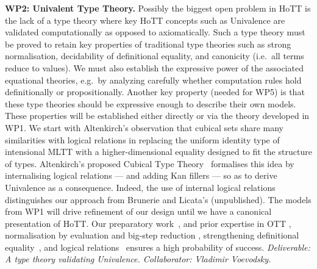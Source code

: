 \documentclass[a4paper,11pt]{article}
\begin{document}
{\bf WP2: Univalent Type Theory.}  Possibly the biggest open problem
in HoTT is the lack of a type theory where key HoTT concepts
such as Univalence are validated computationally as opposed to axiomatically. Such a type theory must be proved to retain key
properties of traditional type theories such as strong normalisation,
decidability of definitional equality, and canonicity ({i.e.}~all
terms reduce to values). We must also establish the expressive power
of the associated equational theories, {e.g.}~by analyzing carefully
whether computation rules hold definitionally or
propositionally. Another key property (needed for WP5) is that these
type theories should be expressive enough to describe their own
models. These properties will be established either directly or via the theory
developed in WP1. We start with Altenkirch's observation \cite{txa-ihp14} that cubical
sets share many similarities with logical relations in replacing the
uniform identity type of intensional MLTT with a higher-dimensional
equality designed to fit the structure of types. Altenkirch's proposed
Cubical Type Theory~\cite{alti-ctt} formalises this idea by internalising logical
relations --- and adding Kan fillers --- so as to derive Univalence as a consequence. Indeed, the use
of internal logical relations distinguishes our approach from Brunerie
and Licata's (unpublished).  The models from WP1 will drive refinement of our design
until we have a canonical presentation of HoTT. Our preparatory
work~\cite{txa-ihp14}, and prior expertise in OTT
\cite{alti:ott-conf}, normalisation by evaluation and big-step
reduction \cite{alti:lics96}, %
strengthening definitional
equality~\cite{Allais:2013:NEN:2502409.2502411}, and logical
relations~\cite{neil2014relParamDep} ensures a high probability of
success.  {\em Deliverable: A
  type theory validating Univalence.  Collaborator: Vladimir
  Voevodsky.  } 




\end{document}
